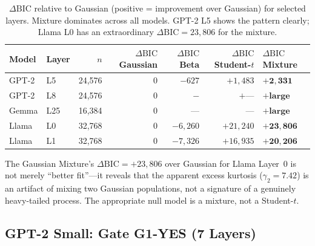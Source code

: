 \documentclass[11pt,a4paper]{article}
\newcommand{\DBIC}{\Delta\text{BIC}}
\begin{document}
\begin{table}[H]
\centering
\caption{$\DBIC$ relative to Gaussian (positive = improvement over Gaussian) for selected layers. Mixture dominates across all models. GPT-2 L5 shows the pattern clearly; Llama L0 has an extraordinary $\DBIC = 23{,}806$ for the mixture.}
\label{tab:bic_compare}
\small
\begin{tabular}{@{}llrrrrl@{}}
\toprule
Model & Layer & $n$ & $\DBIC$ Gaussian & $\DBIC$ Beta & $\DBIC$ Student-$t$ & $\DBIC$ Mixture \\
\midrule
GPT-2 & L5  & 24,576 & 0 & $-627$ & $+1{,}483$ & $\mathbf{+2{,}331}$ \\
GPT-2 & L8  & 24,576 & 0 & $-$    & $+$---     & $\mathbf{+\text{large}}$ \\
Gemma & L25 & 16,384 & 0 & ---    & ---         & $\mathbf{+\text{large}}$ \\
Llama & L0  & 32,768 & 0 & $-6{,}260$ & $+21{,}240$ & $\mathbf{+23{,}806}$ \\
Llama & L1  & 32,768 & 0 & $-7{,}326$ & $+16{,}935$ & $\mathbf{+20{,}206}$ \\
\bottomrule
\end{tabular}
\end{table}

\begin{keyinsight}
The Gaussian Mixture's $\DBIC = +23{,}806$ over Gaussian for Llama Layer~0 is not merely ``better fit''---it reveals that the apparent excess kurtosis ($\gamma_2 = 7.42$) is an artifact of mixing two Gaussian populations, not a signature of a genuinely heavy-tailed process. The appropriate null model is a mixture, not a Student-$t$.
\end{keyinsight}

\subsection{GPT-2 Small: Gate G1-YES (7 Layers)}
\label{sec:gpt2}
\end{document}
